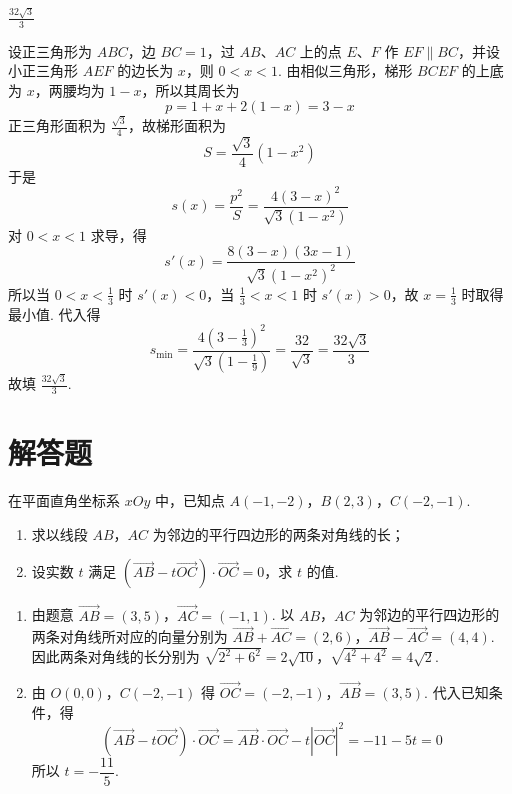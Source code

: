 \begin{answer}
\(\frac{32\sqrt{3}}{3}\)
\end{answer}

\begin{solution}
设正三角形为 \(ABC\)，边 \(BC=1\)，过 \(AB\)、\(AC\) 上的点 \(E\)、\(F\) 作 \(EF\parallel BC\)，并设小正三角形 \(AEF\) 的边长为 \(x\)，则 \(0<x<1\). 由相似三角形，梯形 \(BCEF\) 的上底为 \(x\)，两腰均为 \(1-x\)，所以其周长为
\[
p=1+x+2(1-x)=3-x
\]
正三角形面积为 \(\frac{\sqrt3}{4}\)，故梯形面积为
\[
S=\frac{\sqrt3}{4}(1-x^2)
\]
于是
\[
s(x)=\frac{p^2}{S}=\frac{4(3-x)^2}{\sqrt3(1-x^2)}
\]
对 \(0<x<1\) 求导，得
\[
s'(x)=\frac{8(3-x)(3x-1)}{\sqrt3(1-x^2)^2}
\]
所以当 \(0<x<\frac13\) 时 \(s'(x)<0\)，当 \(\frac13<x<1\) 时 \(s'(x)>0\)，故 \(x=\frac13\) 时取得最小值. 代入得
\[
s_{\min}=\frac{4\left(3-\frac13\right)^2}{\sqrt3\left(1-\frac19\right)}
=\frac{32}{\sqrt3}=\frac{32\sqrt3}{3}
\]
故填 \(\frac{32\sqrt3}{3}\).
\end{solution}
\section{解答题}

\begin{problem}
在平面直角坐标系 \(xOy\) 中，已知点 \(A(-1,-2)\)，\(B(2,3)\)，\(C(-2,-1)\).

\begin{enumerate}
\item 求以线段 \(AB\)，\(AC\) 为邻边的平行四边形的两条对角线的长；
\item 设实数 \(t\) 满足 \(\left(\overrightarrow{AB}-t\overrightarrow{OC}\right)\cdot \overrightarrow{OC}=0\)，求 \(t\) 的值.
\end{enumerate}
\end{problem}

\begin{solution}
\begin{enumerate}
\item 由题意 \(\overrightarrow{AB}=(3,5)\)，\(\overrightarrow{AC}=(-1,1)\).
以 \(AB\)，\(AC\) 为邻边的平行四边形的两条对角线所对应的向量分别为
\(\overrightarrow{AB}+\overrightarrow{AC}=(2,6)\)，\(\overrightarrow{AB}-\overrightarrow{AC}=(4,4)\).
因此两条对角线的长分别为
\(\sqrt{2^2+6^2}=2\sqrt{10}\)，\(\sqrt{4^2+4^2}=4\sqrt{2}\).

\item 由 \(O(0,0)\)，\(C(-2,-1)\) 得 \(\overrightarrow{OC}=(-2,-1)\)，\(\overrightarrow{AB}=(3,5)\).
代入已知条件，得
\[
\left(\overrightarrow{AB}-t\overrightarrow{OC}\right)\cdot\overrightarrow{OC}
=\overrightarrow{AB}\cdot\overrightarrow{OC}-t\left|\overrightarrow{OC}\right|^2
=-11-5t=0
\]
所以 \(t=-\dfrac{11}{5}\).
\end{enumerate}
\end{solution}


